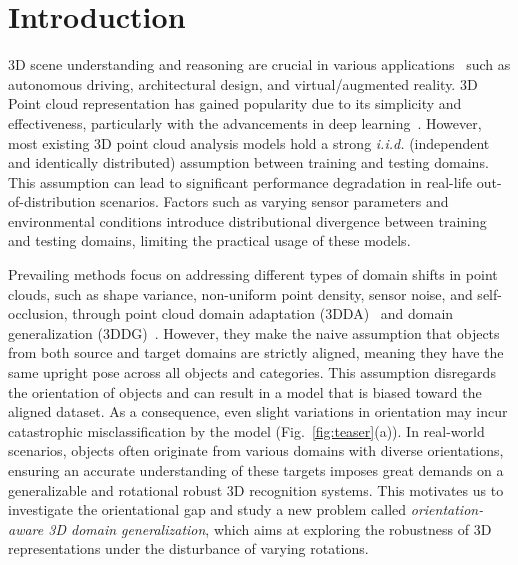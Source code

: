
\section{Introduction}

\indent3D scene understanding and reasoning are crucial in various applications~\cite{leibe2007dynamic, brostow2008segmentation} such as autonomous driving, architectural design, and virtual/augmented reality. 3D Point cloud representation has gained popularity due to its simplicity and effectiveness, particularly with the advancements in deep learning~\cite{wang2019dynamic, qi2017pointnet, zhang2022self}. However, most existing 3D point cloud analysis models hold a strong \textit{i.i.d.} (independent and identically distributed) assumption between training and testing domains. This assumption can lead to significant performance degradation in real-life out-of-distribution scenarios. Factors such as varying sensor parameters and environmental conditions introduce distributional divergence between training and testing domains, limiting the practical usage of these models. 


Prevailing methods focus on addressing different types of domain shifts in point clouds, such as shape variance, non-uniform point density, sensor noise, and self-occlusion, through point cloud domain adaptation (3DDA)~\cite{qin2019pointdan, liang2022point} and domain generalization (3DDG)~\cite{huang2021metasets, wei2022learning}. 
However, they make the naive assumption that objects from both source and target domains are strictly aligned, meaning they have the same upright pose across all objects and categories. This assumption disregards the orientation of objects and can result in a model that is biased toward the aligned dataset. As a consequence, even slight variations in orientation may incur catastrophic misclassification by the model (Fig.~\ref{fig:teaser}(a)). In real-world scenarios, objects often originate from various domains with diverse orientations, ensuring an accurate understanding of these targets imposes great demands on a generalizable and rotational robust 3D recognition systems. This motivates us to investigate the orientational gap and study a new problem called \textit{orientation-aware 3D domain generalization}, which aims at exploring the robustness of 3D representations under the disturbance of varying rotations.

